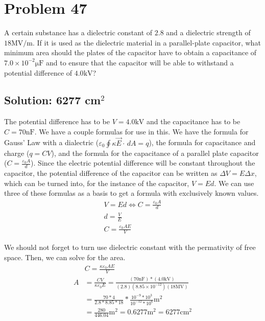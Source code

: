 \documentclass[12pt]{article}
\begin{document}
\pagebreak
\section{Problem 47}
A certain substance has a dielectric constant of $2.8$ and a dielectric strength of $18 \unit{\mega\volt/\meter}$. 
If it is used as the dielectric material in a parallel-plate capacitor, what minimum area should the plates of the capacitor have to obtain a capacitance of $7.0 \times 10^{-2} \unit{\micro\farad}$ and to ensure that the capacitor will be able to withstand a potential difference of $4.0 \unit{\kilo\volt}$?

\subsection*{Solution: 6277 cm$^2$}
The potential difference has to be $V = 4.0 \unit{\kilo\volt}$ and the capacitance has to be $C = 70 \unit{\nano\farad}$. 
We have a couple formulas for use in this. 
We have the formula for Gauss' Law with a dialectric ($\varepsilon_0 \oint\kappa\vec{E}\cdot\,dA = q$), the formula for capacitance and charge ($q = CV$), and the formula for the capacitance of a parallel plate capacitor ($C = \frac{\varepsilon_0 A}{d}$). 
Since the electric potential difference will be constant throughout the capacitor, the potential difference of the capacitor can be written as $\Delta V = E \Delta x$, which can be turned into, for the instance of the capacitor, $V = Ed$.
We can use three of these formulas as a basis to get a formula with exclusively known values.
\begin{gather*}
    V = Ed \Leftrightarrow C = \frac{\varepsilon_0 A}{d}\\
    d   =   \frac{V}{E}\\
    C   =   \frac{\varepsilon_0 A E}{V}
\end{gather*}

We should not forget to turn use dielectric constant with the permativity of free space.
Then, we can solve for the area.
\begin{align*}
    &C  =   \frac{\kappa\varepsilon_0 AE}{V}\\
    A   &=  \frac{CV}{\kappa\varepsilon_0 E}
        =   \frac{(70 \unit{\nano\farad})*(4.0 \unit{\kilo\volt})}{(2.8)(8.85 \times 10^{-12})(18 \unit{\mega\volt})}\\
        &=  \frac{70*4}{2.8*8.85*18} * \frac{10^{-9}*10^3}{10^{-12}*10^6}\unit{\meter^2}\\
        &=  \frac{280}{446.04} \unit{\meter^2}
        =   0.6277 \unit{\meter^2}
        =   \boxed{6277\unit{\centi\meter^2}}
\end{align*}
\end{document}

